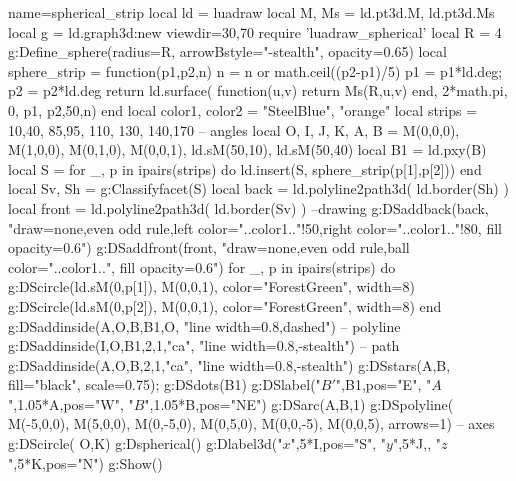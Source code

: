 \begin{luadraw}{name=spherical_strip}
local ld = luadraw
local M, Ms = ld.pt3d.M, ld.pt3d.Ms
local g = ld.graph3d:new{ viewdir={30,70} }
require 'luadraw_spherical'
local R = 4
g:Define_sphere({radius=R, arrowBstyle="-stealth", opacity=0.65})
local sphere_strip = function(p1,p2,n)
    n = n or math.ceil((p2-p1)/5)
    p1 = p1*ld.deg; p2 = p2*ld.deg
    return ld.surface( function(u,v) return Ms(R,u,v) end, 2*math.pi, 0, p1, p2,{50,n})
end
local color1, color2 = "SteelBlue", "orange"
local strips ={ {10,40}, {85,95}, {110, 130}, {140,170} } -- angles
local O, I, J, K, A, B = M(0,0,0), M(1,0,0), M(0,1,0), M(0,0,1), ld.sM(50,10), ld.sM(50,40)
local B1 = ld.pxy(B)
local S = {}
for _, p in ipairs(strips) do
    ld.insert(S, sphere_strip(p[1],p[2]))
end
local Sv, Sh = g:Classifyfacet(S)
local back = ld.polyline2path3d( ld.border(Sh) )
local front = ld.polyline2path3d( ld.border(Sv) )
--drawing
g:DSaddback(back, "draw=none,even odd rule,left color="..color1.."!50,right color="..color1.."!80, fill opacity=0.6")
g:DSaddfront(front, "draw=none,even odd rule,ball color="..color1..", fill opacity=0.6")  
for _, p in ipairs(strips) do
    g:DScircle({ld.sM(0,p[1]), M(0,0,1)}, {color="ForestGreen", width=8})
    g:DScircle({ld.sM(0,p[2]), M(0,0,1)}, {color="ForestGreen", width=8})
end
g:DSaddinside({A,O,B,B1,O}, "line width=0.8,dashed") -- polyline
g:DSaddinside({I,O,B1,2,1,"ca"}, "line width=0.8,-stealth") -- path
g:DSaddinside({A,O,B,2,1,"ca"}, "line width=0.8,-stealth")
g:DSstars({A,B}, {fill="black", scale=0.75}); g:DSdots(B1)
g:DSlabel("$B'$",B1,{pos="E"}, "$A$",1.05*A,{pos="W"}, "$B$",1.05*B,{pos="NE"})
g:DSarc({A,B},1)
g:DSpolyline( {{M(-5,0,0), M(5,0,0)}, {M(0,-5,0), M(0,5,0)}, {M(0,0,-5), M(0,0,5)}}, {arrows=1}) -- axes
g:DScircle( {O,K})
g:Dspherical()
g:Dlabel3d("$x$",5*I,{pos="S"}, "$y$",5*J,{}, "$z$",5*K,{pos="N"})
g:Show()
\end{luadraw}
